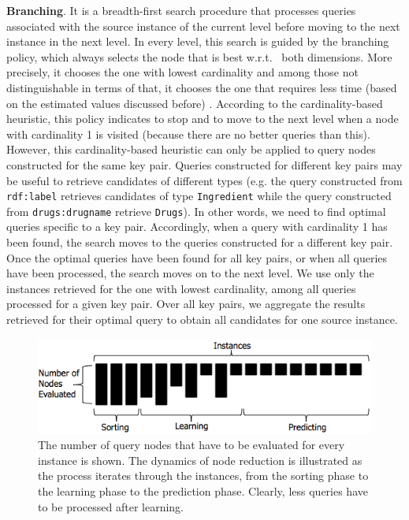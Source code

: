 \textbf{Branching}. It is a breadth-first search procedure that processes queries associated with the source instance of the current level before moving to the next instance in the next level. In every level, this search is guided by the branching policy, which always selects the node that is best w.r.t.~ both dimensions. More precisely, it chooses the one with lowest cardinality and among those not distinguishable in terms of that, it chooses the one that requires less time (based on the estimated values discussed before) . According to the cardinality-based heuristic, this policy indicates to stop and to move to the next level when a node with cardinality 1 is visited (because there are no better queries than this). However, this cardinality-based heuristic can only be applied to query nodes constructed for the same key pair. Queries constructed for different key pairs may be useful to retrieve candidates of different types (e.g. the query constructed from \verb+rdf:label+ retrieves candidates of type \verb+Ingredient+ while the query constructed from \verb+drugs:drugname+ retrieve \verb+Drugs+). In other words, we need to find optimal queries specific to a key pair. Accordingly, when a query with cardinality 1 has been found, the search moves to the queries constructed for a different key pair. 
Once the optimal queries have been found for all key pairs, or when all queries have been processed, the search moves on to the next level. We use only the instances retrieved for the one with lowest cardinality, among all queries processed for a given key pair. Over all key pairs, we aggregate the results retrieved for their optimal query to obtain all candidates for one source instance. 

\begin{figure} 
\vspace{-10pt}
\centering
\includegraphics[scale=0.5]{p23.png}
\caption{The number of query nodes that have to be evaluated for every instance is shown. The dynamics of node reduction is illustrated as the process iterates through the instances, from the sorting phase to the learning phase to the prediction phase. Clearly, less queries have to be processed after learning.} 
\label{fig:3phases}
\vspace{-15pt}
\end{figure} 

